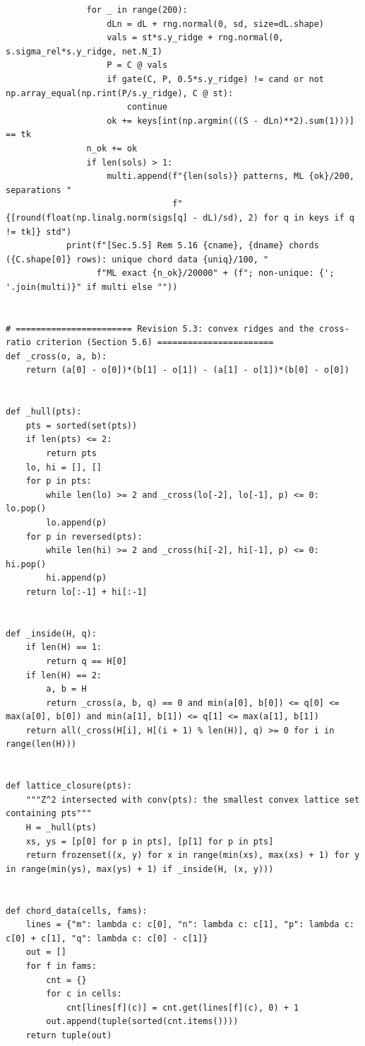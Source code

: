 \documentclass[11pt,a4paper]{article}
\theoremstyle{definition}
\theoremstyle{remark}
\begin{document}
\begin{lstlisting}
                for _ in range(200):
                    dLn = dL + rng.normal(0, sd, size=dL.shape)
                    vals = st*s.y_ridge + rng.normal(0, s.sigma_rel*s.y_ridge, net.N_I)
                    P = C @ vals
                    if gate(C, P, 0.5*s.y_ridge) != cand or not np.array_equal(np.rint(P/s.y_ridge), C @ st):
                        continue
                    ok += keys[int(np.argmin(((S - dLn)**2).sum(1)))] == tk
                n_ok += ok
                if len(sols) > 1:
                    multi.append(f"{len(sols)} patterns, ML {ok}/200, separations "
                                 f"{[round(float(np.linalg.norm(sigs[q] - dL)/sd), 2) for q in keys if q != tk]} std")
            print(f"[Sec.5.5] Rem 5.16 {cname}, {dname} chords ({C.shape[0]} rows): unique chord data {uniq}/100, "
                  f"ML exact {n_ok}/20000" + (f"; non-unique: {'; '.join(multi)}" if multi else ""))


# ======================= Revision 5.3: convex ridges and the cross-ratio criterion (Section 5.6) =======================
def _cross(o, a, b):
    return (a[0] - o[0])*(b[1] - o[1]) - (a[1] - o[1])*(b[0] - o[0])


def _hull(pts):
    pts = sorted(set(pts))
    if len(pts) <= 2:
        return pts
    lo, hi = [], []
    for p in pts:
        while len(lo) >= 2 and _cross(lo[-2], lo[-1], p) <= 0: lo.pop()
        lo.append(p)
    for p in reversed(pts):
        while len(hi) >= 2 and _cross(hi[-2], hi[-1], p) <= 0: hi.pop()
        hi.append(p)
    return lo[:-1] + hi[:-1]


def _inside(H, q):
    if len(H) == 1:
        return q == H[0]
    if len(H) == 2:
        a, b = H
        return _cross(a, b, q) == 0 and min(a[0], b[0]) <= q[0] <= max(a[0], b[0]) and min(a[1], b[1]) <= q[1] <= max(a[1], b[1])
    return all(_cross(H[i], H[(i + 1) % len(H)], q) >= 0 for i in range(len(H)))


def lattice_closure(pts):
    """Z^2 intersected with conv(pts): the smallest convex lattice set containing pts"""
    H = _hull(pts)
    xs, ys = [p[0] for p in pts], [p[1] for p in pts]
    return frozenset((x, y) for x in range(min(xs), max(xs) + 1) for y in range(min(ys), max(ys) + 1) if _inside(H, (x, y)))


def chord_data(cells, fams):
    lines = {"m": lambda c: c[0], "n": lambda c: c[1], "p": lambda c: c[0] + c[1], "q": lambda c: c[0] - c[1]}
    out = []
    for f in fams:
        cnt = {}
        for c in cells:
            cnt[lines[f](c)] = cnt.get(lines[f](c), 0) + 1
        out.append(tuple(sorted(cnt.items())))
    return tuple(out)



\end{lstlisting}
\end{document}
